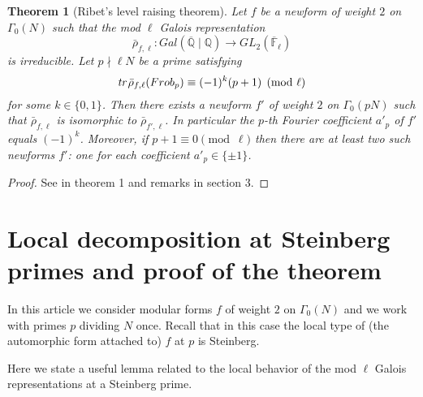 \documentclass[12pt,reqno]{amsart}
\theoremstyle{plain}
\newtheorem{theorem}{Theorem}[section]
\theoremstyle{definition}
\begin{document}
\begin{theorem}[Ribet's level raising theorem]
Let $f$ be a newform of weight $2$ on $\Gamma_0(N)$ such that the mod $\ell$ Galois representation
$$
\bar\rho_{f,\ell}: Gal(\overline{\mathbb Q}\mid \mathbb Q)\longrightarrow GL_2(\overline{\mathbb F}_\ell)
$$
is irreducible. Let $p\nmid \ell N$ be a prime satisfying
$$
\emph{\text{tr}}\,\bar\rho_{f,\ell}(Frob_p) \equiv (-1)^k(p+1) \pmod \ell
$$
for some $k\in\{0,1\}$. 
Then there exists a newform $f'$ of weight $2$ on $\Gamma_0(pN)$ such that $\bar\rho_{f,\ell}$ is isomorphic to $\bar\rho_{f',\ell}$. In particular the $p$-th Fourier coefficient $a'_p$ of $f'$ equals $(-1)^k$. Moreover, if $p+1\equiv 0\pmod \ell$ then there are at least two such newforms $f'$: one for each coefficient $a'_p\in\{\pm1\}$.
\end{theorem}
\begin{proof}
See in \cite{RibetRai} theorem 1 and remarks in section $3$.
\end{proof}

\section{Local decomposition at Steinberg primes and proof of the theorem}
In this article we consider modular forms $f$ of weight $2$ on $\Gamma_0(N)$ and we work with primes $p$ dividing $N$ once. Recall that in this case the local type of (the automorphic form attached to) $f$ at $p$ is Steinberg.
 
Here we state a useful lemma related to the local behavior of the mod $\ell$ Galois representations at a Steinberg prime.
\end{document}

